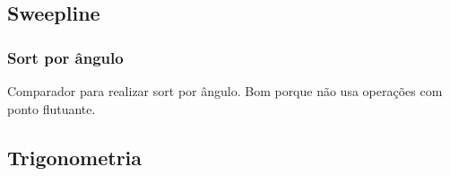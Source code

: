 
\subsection{Sweepline}
\subsubsection{Sort por \^{a}ngulo}
Comparador para realizar sort por \^{a}ngulo. Bom porque n\~{a}o usa opera\c{c}\~{o}es com ponto flutuante.
\divisor


\subsection{Trigonometria}
